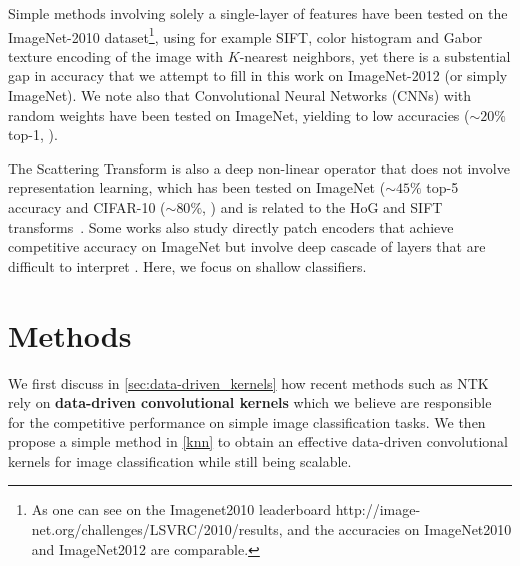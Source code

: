 \documentclass{article} %
\begin{document}
Simple methods involving solely a single-layer of  features  have been tested on the ImageNet-2010 dataset\footnote{ As one can see on the Imagenet2010 leaderboard http://image-net.org/challenges/LSVRC/2010/results, and the accuracies on ImageNet2010 and ImageNet2012 are comparable.}, using for example SIFT, color histogram and Gabor texture encoding of the image with $K$-nearest neighbors, yet there is a substential gap in accuracy that we attempt to fill in this work on ImageNet-2012 (or simply ImageNet). We note also that Convolutional Neural Networks (CNNs) with random weights have been tested on ImageNet, yielding to low accuracies ($\sim 20\%$ top-1, \citep{arandjelovic2017look}).

The Scattering Transform \citep{mallat2012group} is also a deep non-linear operator that does not involve representation learning, which has been tested on ImageNet ($\sim 45\%$ top-5 accuracy \citep{zarka2019deep} and  CIFAR-10 ($\sim 80 \%$, \citep{Oyallon_2015_CVPR}) and is related to the HoG and SIFT transforms~\citep{Oyallon_2018_ECCV}.
Some works also study directly patch encoders that achieve competitive accuracy on ImageNet but involve deep cascade of layers that are difficult to interpret \citep{oyallon2017scaling,zarka2019deep,brendel2019approximating}. Here, we focus on shallow classifiers.

\section{Methods}
\label{method}
We first discuss in \ref{sec:data-driven_kernels} how recent methods such as NTK rely on \textbf{data-driven convolutional kernels} which we believe are responsible for the competitive performance on simple image classification tasks. We then propose a simple method in \ref{knn} to obtain an effective data-driven convolutional kernels for image classification while still being scalable.
\end{document}
